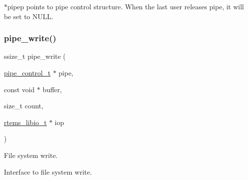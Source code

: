 $\ast$pipep points to pipe control structure. When the last user releases pipe, it will be set to N\+U\+LL. \mbox{\label{group__FIFO__PIPE_gaa3c5b709d15ee5abdfff8552a8052a67}} 
\subsubsection{\texorpdfstring{pipe\_write()}{pipe\_write()}}
{\footnotesize\ttfamily ssize\+\_\+t pipe\+\_\+write (\begin{DoxyParamCaption}\item[{\mbox{\hyperlink{structpipe__control}{pipe\+\_\+control\+\_\+t}} $\ast$}]{pipe,  }\item[{const void $\ast$}]{buffer,  }\item[{size\+\_\+t}]{count,  }\item[{\mbox{\hyperlink{structrtems__libio__tt}{rtems\+\_\+libio\+\_\+t}} $\ast$}]{iop }\end{DoxyParamCaption})}



File system write. 

Interface to file system write. 